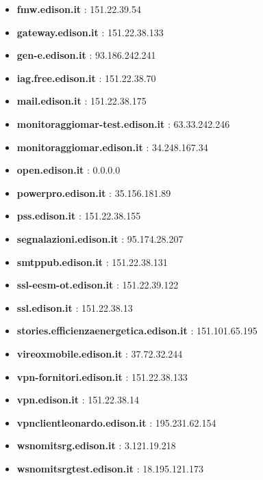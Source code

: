 \documentclass{article}
\begin{document}
\begin{itemize}
            \item \textbf{ fmw.edison.it }: 151.22.39.54
        
            \item \textbf{ gateway.edison.it }: 151.22.38.133
        
            \item \textbf{ gen-e.edison.it }: 93.186.242.241
        
            \item \textbf{ iag.free.edison.it }: 151.22.38.70
        
            \item \textbf{ mail.edison.it }: 151.22.38.175
        
            \item \textbf{ monitoraggiomar-test.edison.it }: 63.33.242.246
        
            \item \textbf{ monitoraggiomar.edison.it }: 34.248.167.34
        
            \item \textbf{ open.edison.it }: 0.0.0.0
        
            \item \textbf{ powerpro.edison.it }: 35.156.181.89
        
            \item \textbf{ pss.edison.it }: 151.22.38.155
        
            \item \textbf{ segnalazioni.edison.it }: 95.174.28.207
        
            \item \textbf{ smtppub.edison.it }: 151.22.38.131
        
            \item \textbf{ ssl-eesm-ot.edison.it }: 151.22.39.122
        
            \item \textbf{ ssl.edison.it }: 151.22.38.13
        
            \item \textbf{ stories.efficienzaenergetica.edison.it }: 151.101.65.195
        
            \item \textbf{ vireoxmobile.edison.it }: 37.72.32.244
        
            \item \textbf{ vpn-fornitori.edison.it }: 151.22.38.133
        
            \item \textbf{ vpn.edison.it }: 151.22.38.14
        
            \item \textbf{ vpnclientleonardo.edison.it }: 195.231.62.154
        
            \item \textbf{ wsnomitsrg.edison.it }: 3.121.19.218
        
            \item \textbf{ wsnomitsrgtest.edison.it }: 18.195.121.173
        
    
\end{itemize}
\end{document}
